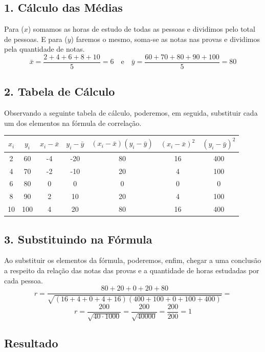 \documentclass[a4paper,12pt,openany]{book}
\begin{document}
\subsection*{1. Cálculo das Médias}
Para (\(x\)) somamos as horas de estudo de todas as pessoas e dividimos pelo total de pessoas. E para (\(y\)) faremos o mesmo, soma-se as notas nas provas e dividimos pela quantidade de notas. 
\[
\bar{x} = \frac{2 + 4 + 6 + 8 + 10}{5} = 6
\quad \text{e} \quad
\bar{y} = \frac{60 + 70 + 80 + 90 + 100}{5} = 80
\]

\subsection*{2. Tabela de Cálculo}
Observando a seguinte tabela de cálculo, poderemos, em seguida, substituir cada um dos elementos na fórmula de correlação.
\begin{center}
\begin{tabular}{ccccccc}
\toprule
\(x_i\) & \(y_i\) & \(x_i - \bar{x}\) & \(y_i - \bar{y}\) & \((x_i - \bar{x})(y_i - \bar{y})\) & \((x_i - \bar{x})^2\) & \((y_i - \bar{y})^2\) \\
\midrule
2  & 60  & -4 & -20 & 80  & 16 & 400 \\
4  & 70  & -2 & -10 & 20  & 4  & 100 \\
6  & 80  & 0  & 0   & 0   & 0  & 0   \\
8  & 90  & 2  & 10  & 20  & 4  & 100 \\
10 & 100 & 4  & 20  & 80  & 16 & 400 \\
\bottomrule
\end{tabular}
\end{center}

\subsection*{3. Substituindo na Fórmula}
Ao substituir os elementos da fórmula, poderemos, enfim, chegar a uma conclusão a respeito da relação das notas das provas e a quantidade de horas estudadas por cada pessoa. 
\[
r = \frac{80 + 20 + 0 + 20 + 80}{\sqrt{(16 + 4 + 0 + 4 + 16)(400 + 100 + 0 + 100 + 400)}}=
\]
\vspace{1cm}
\[
r = \frac{200}{\sqrt{40 \cdot 1000}} = \frac{200}{\sqrt{40000}} = \frac{200}{200} = 1
\]

\subsection{Resultado}
\end{document}
